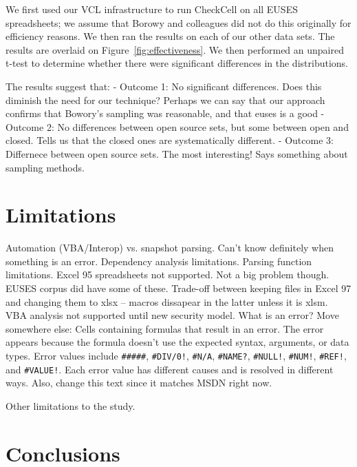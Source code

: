 \documentclass[conference]{IEEEtran}
\begin{document}
We first used our VCL infrastructure to run CheckCell on all EUSES spreadsheets; we assume
that Borowy and colleagues did not do this originally for efficiency reasons.
We then ran the results on each of our other data sets.
The results are overlaid on Figure~\ref{fig:effectiveness}.
We then performed an unpaired t-test to determine whether there were significant differences
in the distributions.

The results suggest that:
- Outcome 1: No significant differences. Does this diminish the need for our technique?
  Perhaps we can say that our approach confirms that Bowory's sampling was reasonable,
  and that euses is a good 
- Outcome 2: No differences between open source sets, but some between open and closed. 
  Tells us that the closed ones are systematically different.
- Outcome 3: Differnece between open source sets. The most interesting! Says something about 
  sampling methods.


\section{Limitations}

Automation (VBA/Interop) vs. snapshot parsing. Can't know definitely when
something is an error.
%
Dependency analysis limitations.
%
Parsing function limitations.
%
Excel 95 spreadsheets not supported. Not a big problem though. EUSES corpus did have some of these. Trade-off between keeping files in Excel 97 and changing them to xlsx -- macros dissapear in the latter unless it is xlsm.
%
VBA analysis not supported until new security model.
%
What is an error? Move somewhere else: Cells containing formulas that result in an error. The error appears because the formula doesn't use the expected syntax, arguments, or data types. Error values include \texttt{\#\#\#\#\#}, \texttt{\#DIV/0!}, \texttt{\#N/A}, \texttt{\#NAME?}, \texttt{\#NULL!}, \texttt{\#NUM!}, \texttt{\#REF!}, and \texttt{\#VALUE!}. Each error value has different causes and is resolved in different ways. Also, change this text since it matches MSDN right now.

Other limitations to the study.

\section{Conclusions}
\end{document}
